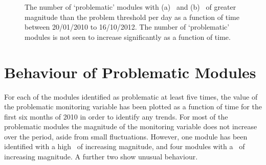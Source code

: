 \begin{figure}
	\centering
  \caption[The number of `problematic' modules with \deltat\ and \tdiff\
  with magnitude greater than the problem threshold per day as a function of time
  between 20/01/2010 to 16/10/2012. ]{The number of `problematic' modules with
  (a) \deltat\ and (b) \tdiff\ of greater magnitude than the problem threshold
  per day as a function of time between 20/01/2010 to 16/10/2012. The number of
  `problematic' modules is not seen to increase significantly as a function of
  time.}
	\label{fig:num_pm}
\end{figure}

\section{Behaviour of Problematic Modules}

For each of the modules identified as problematic at least five times, the value of the problematic monitoring
variable has been plotted as a function of time for the first six months of 2010
in order to identify any trends. For most of the
problematic modules the magnitude of the monitoring variable does not increase
over the period, aside from small fluctuations.  However, one module has been
identified with a high \deltat\ of increasing magnitude, and four modules with a
\tdiff\ of increasing magnitude. A further two show unusual behaviour. 

